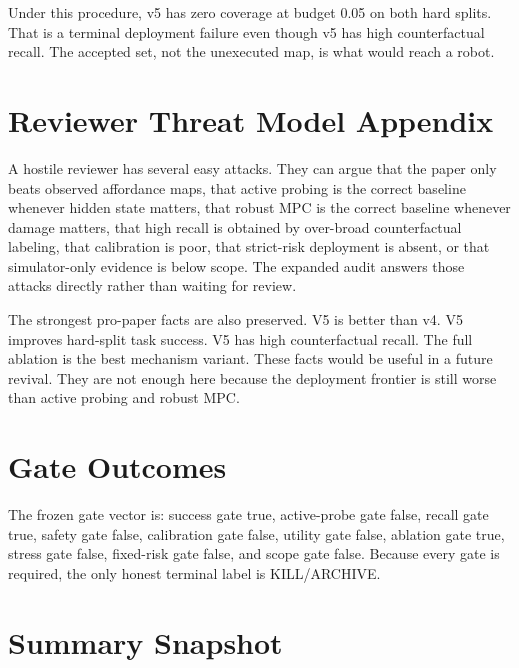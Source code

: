 \documentclass{article}
\newcommand{\terminal}{\textsc{KILL/ARCHIVE}}
\begin{document}
Under this procedure, v5 has zero coverage at budget 0.05 on both hard splits. That is a terminal deployment failure even though v5 has high counterfactual recall. The accepted set, not the unexecuted map, is what would reach a robot.

\section{Reviewer Threat Model Appendix}
A hostile reviewer has several easy attacks. They can argue that the paper only beats observed affordance maps, that active probing is the correct baseline whenever hidden state matters, that robust MPC is the correct baseline whenever damage matters, that high recall is obtained by over-broad counterfactual labeling, that calibration is poor, that strict-risk deployment is absent, or that simulator-only evidence is below scope. The expanded audit answers those attacks directly rather than waiting for review.

The strongest pro-paper facts are also preserved. V5 is better than v4. V5 improves hard-split task success. V5 has high counterfactual recall. The full ablation is the best mechanism variant. These facts would be useful in a future revival. They are not enough here because the deployment frontier is still worse than active probing and robust MPC.

\section{Gate Outcomes}
The frozen gate vector is: success gate true, active-probe gate false, recall gate true, safety gate false, calibration gate false, utility gate false, ablation gate true, stress gate false, fixed-risk gate false, and scope gate false. Because every gate is required, the only honest terminal label is \terminal{}.

\section{Summary Snapshot}
\end{document}
